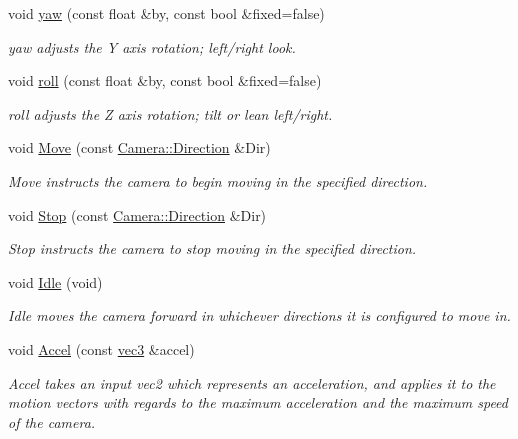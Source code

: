 \begin{DoxyCompactItemize}
void \hyperlink{class_camera_a0ce7d12edbe47d9a8915d8af98d8f524}{yaw} (const float \&by, const bool \&fixed=false)
\begin{DoxyCompactList}\small\item\em yaw adjusts the \-Y axis rotation; left/right look. \end{DoxyCompactList}\item 
void \hyperlink{class_camera_a1ba0979fe0b2ec58085d5f9721858e5e}{roll} (const float \&by, const bool \&fixed=false)
\begin{DoxyCompactList}\small\item\em roll adjusts the \-Z axis rotation; tilt or lean left/right. \end{DoxyCompactList}\item 
void \hyperlink{class_camera_a421e03f93824e178d6e77ff547cd290e}{\-Move} (const \hyperlink{class_camera_a80cb65605322d27ad3b6d973484509ec}{\-Camera\-::\-Direction} \&\-Dir)
\begin{DoxyCompactList}\small\item\em \-Move instructs the camera to begin moving in the specified direction. \end{DoxyCompactList}\item 
void \hyperlink{class_camera_adf064f765f610684e0675bd67de013fd}{\-Stop} (const \hyperlink{class_camera_a80cb65605322d27ad3b6d973484509ec}{\-Camera\-::\-Direction} \&\-Dir)
\begin{DoxyCompactList}\small\item\em \-Stop instructs the camera to stop moving in the specified direction. \end{DoxyCompactList}\item 
void \hyperlink{class_camera_aec3559fe43597656629fdb00157d3c73}{\-Idle} (void)
\begin{DoxyCompactList}\small\item\em \-Idle moves the camera forward in whichever directions it is configured to move in. \end{DoxyCompactList}\item 
void \hyperlink{class_camera_a8eb4ebda2379e7289bb2bb942a2796b4}{\-Accel} (const \hyperlink{struct_angel_1_1vec3}{vec3} \&accel)
\begin{DoxyCompactList}\small\item\em \-Accel takes an input vec2 which represents an acceleration, and applies it to the motion vectors with regards to the maximum acceleration and the maximum speed of the camera. \end{DoxyCompactList}\item 

\end{DoxyCompactItemize}
